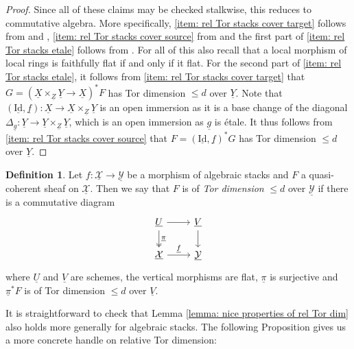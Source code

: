 \documentclass[11pt]{amsart}
\theoremstyle{definition}
\theoremstyle{definition}
\newtheorem{definition}[theorem]{Definition}
\newcommand{\ul}[1]{\underline{#1}}
\begin{document}
\begin{proof}
    Since all of these claims may be checked stalkwise, this reduces to commutative algebra. More specifically, \eqref{item: rel Tor stacks cover target} follows from \cite[066M]{stacks} and \cite[0B67]{stacks}, \eqref{item: rel Tor stacks cover source} from \cite[0DJF]{stacks} and the first part of \eqref{item: rel Tor stacks etale} follows from \cite[066K]{stacks}. For all of this also recall that a local morphism of local rings is faithfully flat if and only if it flat. 
    For the second part of \eqref{item: rel Tor stacks etale}, it follows from \eqref{item: rel Tor stacks cover target} that $G=(\underline{X}\times_{\underline{Z}} \underline{Y}\rightarrow \underline{X})^{*}F$ has Tor dimension $\leq d$ over $\underline{Y}$. Note that $(\underline{\text{Id}},\underline{f})\colon \underline{X}\rightarrow \underline{X}\times_{\underline{Z}} \underline{Y}$ is an open immersion as it is a base change of the diagonal $\Delta_{\ul{g}}\colon \underline{Y}\rightarrow \underline{Y}\times_{\underline{Z}} \underline{Y}$, which is an open immersion as $\underline{g}$ is \'etale. It thus follows from \eqref{item: rel Tor stacks cover source} that $F=(\underline{\text{Id}},\underline{f})^*G$ has Tor dimension $\leq d$ over $\underline{Y}$.
\end{proof}
\begin{definition}
    Let $f\colon \underline{\mathcal{X}}\rightarrow \underline{\mathcal{Y}}$ be a morphism of algebraic stacks and $F$ a quasi-coherent sheaf on $\underline{\mathcal{X}}$. Then we say that $F$ is of \textit{Tor dimension} $\leq d$ over $\underline{\mathcal{Y}}$ if there is a commutative diagram 
    \begin{equation*}
    \begin{tikzcd}
        \underline{U} \rar\dar[two heads, "\underline{\pi}"] & \underline{V}\dar\\ \underline{\mathcal{X}} \rar["\underline{f}"] & \underline{\mathcal{Y}}
    \end{tikzcd}
    \end{equation*}
    where $\underline{U}$ and $\underline{V}$ are schemes, the vertical morphisms are flat, $\underline{\pi}$ is surjective and $\underline{\pi}^*F$ is of Tor dimension $\leq d$ over $\underline{V}$.
\end{definition}
It is straightforward to check that Lemma \ref{lemma: nice properties of rel Tor dim} also holds more generally for algebraic stacks. The following Proposition gives us a more concrete handle on relative Tor dimension:
\end{document}

